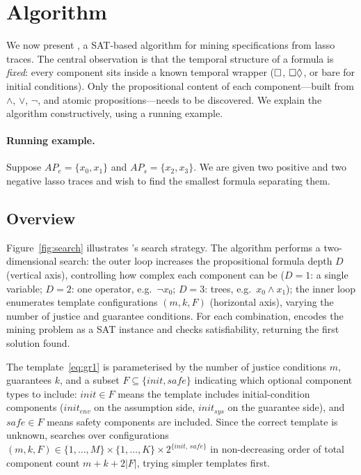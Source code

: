 \section{Algorithm}\label{sec:algo}

We now present \toolname, a SAT-based algorithm for mining \GRone
specifications from lasso traces.
The central observation is that the temporal structure of a \GRone
formula is \emph{fixed}: every component sits inside a known temporal
wrapper ($\square$, $\square\Diamond$, or bare for initial
conditions).
Only the propositional content of each component---built from
$\land$, $\lor$, $\lnot$, and atomic propositions---needs to be
discovered.
We explain the algorithm constructively, using a running example.

\paragraph{Running example.}
Suppose $\mathit{AP}_e = \{x_0, x_1\}$ and
$\mathit{AP}_s = \{x_2, x_3\}$.
We are given two positive and two negative lasso traces and wish
to find the smallest \GRone formula separating them.

\subsection{Overview}\label{sec:overview}

Figure~\ref{fig:search} illustrates \toolname's search strategy.
The algorithm performs a two-dimensional search: the outer loop
increases the propositional formula depth $D$ (vertical axis),
controlling how complex each component can be
($D{=}1$: a single variable;
$D{=}2$: one operator, e.g.\ $\lnot x_0$;
$D{=}3$: trees, e.g.\ $x_0 \land x_1$);
the inner loop enumerates template configurations $(m,k,F)$
(horizontal axis), varying the number of justice and guarantee
conditions.
For each combination, \toolname encodes the mining problem as a SAT
instance and checks satisfiability, returning the first solution
found.



The \GRone template~\eqref{eq:gr1} is parameterised by the number
of justice conditions $m$, guarantees $k$, and a subset
$F \subseteq \{\mathit{init}, \mathit{safe}\}$ indicating which
optional component types to include: $\mathit{init} \in F$ means
the template includes initial-condition components
($\mathit{init}_\mathit{env}$ on the assumption side,
$\mathit{init}_\mathit{sys}$ on the guarantee side), and
$\mathit{safe} \in F$ means safety components are included.
Since the correct template is unknown, \toolname searches over
configurations $(m, k, F)
\in \{1,\ldots,M\} \times \{1,\ldots,K\} \times
2^{\{\mathit{init},\,\mathit{safe}\}}$
in non-decreasing order of total component count
$m + k + 2|F|$,
trying simpler templates first.

